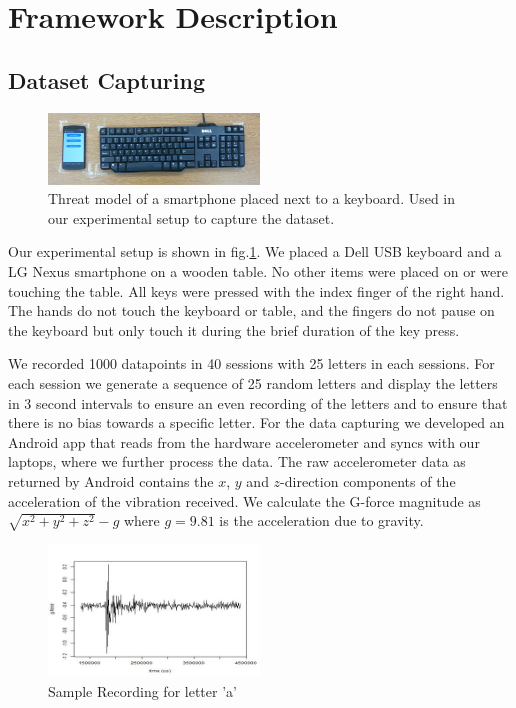 \documentclass[11pt,conference]{IEEEtran}
\begin{document}
\section{Framework Description}

\subsection{Dataset Capturing}
\label{sec:dataset-capturing}

\begin{figure}
\centering
\includegraphics[width=0.5\textwidth]{img/setup}
\caption{Threat model of a smartphone placed next to a keyboard. Used in our experimental setup to capture the dataset.
}
\label{fig:setup}
\end{figure}

Our experimental setup is shown in fig.\ref{fig:setup}. We placed a Dell USB keyboard and a LG Nexus smartphone on a wooden table. No other items were placed on or were touching the table. All keys were pressed with the index finger of the right hand. The hands do not touch the keyboard or table, and the fingers do not pause on the keyboard but only touch it during the brief duration of the key press.

We recorded 1000 datapoints in 40 sessions with 25 letters in each sessions. For each session we generate a sequence of 25 random letters and display the letters in 3 second intervals to ensure an even recording of the letters and to ensure that there is no bias towards a specific letter. For the data capturing we developed an Android app that reads from the hardware accelerometer and syncs with our laptops, where we further process the data. The raw accelerometer data as returned by Android contains the $x$, $y$ and $z$-direction components of the acceleration of the vibration received. We calculate the G-force magnitude as $\sqrt{x^2+y^2+z^2}-g$ where $g = 9.81$ is the acceleration due to gravity.

\begin{figure}
\centering
\includegraphics[width=0.5\textwidth]{img/signal2}
\caption{Sample Recording for letter 'a'}
\label{fig:signal}
\end{figure}
\end{document}
